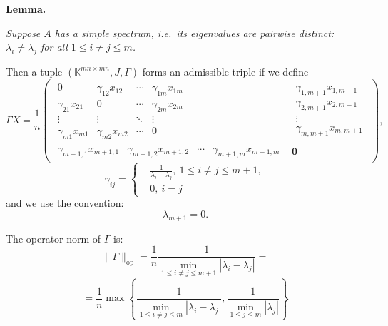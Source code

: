 \documentclass[a4paper]{jpconf}
\begin{document}
\begin{center}
\textbf{Lemma.}
{\it
Suppose \( A \) has a simple spectrum,
    i.e.\ its eigenvalues are pairwise distinct:
    \( \lambda_i\neq\lambda_j \) for all \( 1\leq i{\neq}j \leq m \).

    Then a tuple \( (\mathbb{K}^{{mn}{\times}{mn}}, J, \Gamma) \)
        forms an admissible triple if we define
    \[
        \Gamma X = 
            \frac1n \left(\begin{array}{c|c}
            \begin{matrix}
                0               & \gamma_{12}x_{12} & \cdots & \gamma_{1m}x_{1m} \\
                \gamma_{21}x_{21}  & 0              & \cdots & \gamma_{2m}x_{2m} \\
                \vdots          & \vdots         & \ddots & \vdots & \ \\
                \gamma_{m1}x_{m1}  & \gamma_{m2}x_{m2} & \cdots & 0
            \end{matrix} &
            \begin{matrix}
                \gamma_{1,m+1}x_{1,m+1} \\
                \gamma_{2,m+1}x_{2,m+1} \\
                \vdots \\
                \gamma_{m,m+1}x_{m,m+1}
            \end{matrix} \\ \hline
            \begin{matrix}
                \gamma_{m{+}1,1}x_{m{+}1,1} &
                \gamma_{m{+}1,2}x_{m{+}1,2} &
                \cdots &
                \gamma_{m{+}1,m}x_{m{+}1,m}
            \end{matrix} &
            \mathbf{0}
        \end{array}\right),
    \]
    \[
        \gamma_{ij} = \left\{
            \begin{aligned}
                & \frac{1}{\lambda_i - \lambda_j},\ 1\leq i{\neq}j \leq m{+}1,\\
                & 0,\ i=j
            \end{aligned}
            \right.
    \]
    and we use the convention:
    \[
        \lambda_{m{+}1} = 0.
    \]

    The operator norm of \( \Gamma \) is:
    \[
        \|\Gamma\|_{\mathrm{op}} =
        \frac1n
        \frac{1}{\min_{1\leq i{\neq}j \leq m{+}1}|\lambda_i - \lambda_j|} =
        \]
    \[
        = \frac1n
         \max\left\{
         \frac{1}{
             \min\limits_{1\leq i{\neq}j \leq m }{|\lambda_i - \lambda_j|}},
         \frac{1}{
             \min\limits_{1\leq j \leq m}{|\lambda_j|}}
         \right\}
        \]
\/}
\end{center}
\end{document}

